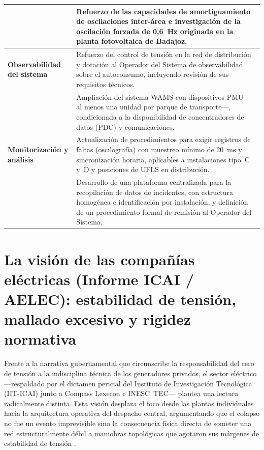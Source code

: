 \begin{table}[H]
\begin{tabularx}{\textwidth}{>{\centering\bfseries}p{3.2cm} >{\centering\arraybackslash}X}
&
Refuerzo de las capacidades de amortiguamiento de oscilaciones
inter-área e investigación de la oscilación forzada de 0,6~Hz originada
en la planta fotovoltaica de Badajoz. \\

\midrule

\textbf{Observabilidad del sistema} &
Refuerzo del control de tensión en la red de distribución y dotación al
Operador del Sistema de observabilidad sobre el autoconsumo, incluyendo
revisión de sus requisitos técnicos. \\
\addlinespace

&
Ampliación del sistema WAMS con dispositivos PMU ---al menos una unidad
por parque de transporte---, condicionada a la disponibilidad de
concentradores de datos (PDC) y comunicaciones. \\

\midrule

\textbf{Monitorización y análisis} &
Actualización de procedimientos para exigir registros de faltas
(oscilografía) con muestreo mínimo de 20~ms y sincronización horaria,
aplicables a instalaciones tipo~C y~D y posiciones de UFLS en
distribución. \\
\addlinespace

&
Desarrollo de una plataforma centralizada para la recopilación de datos
de incidentes, con estructura homogénea e identificación por
instalación, y definición de un procedimiento formal de remisión al
Operador del Sistema. \\

\bottomrule
\end{tabularx}
\end{table}


\section{La visión de las compañías eléctricas (Informe ICAI / AELEC): estabilidad de
tensión, mallado excesivo y rigidez normativa}
\label{sec:vision_icai}

Frente a la narrativa gubernamental que circunscribe la responsabilidad
del cero de tensión a la indisciplina técnica de los generadores
privados, el sector eléctrico ---respaldado por el dictamen pericial del
Instituto de Investigación Tecnológica (IIT-ICAI) junto a Compass
Lexecon e INESC~TEC--- plantea una lectura radicalmente distinta. Esta
visión desplaza el foco desde las plantas individuales hacia la
arquitectura operativa del despacho central, argumentando que el
colapso no fue un evento imprevisible sino la consecuencia física
directa de someter una red estructuralmente débil a maniobras
topológicas que agotaron sus márgenes de estabilidad de tensión
\cite{icai2025,blackswan2025}.

